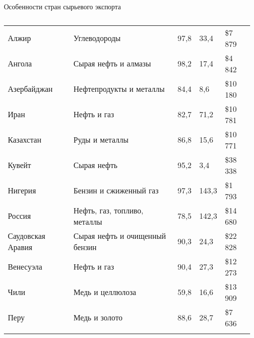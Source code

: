 \documentclass[_Venture_p2.tex]{subfiles}
\begin{document}
\begin{frame}{Особенности стран сырьевого экспорта}
\begin{table}[htbp]
	\centering
	\tiny
	\caption{}
	\begin{tabularx}{\linewidth}
	[b]{@{}>{\raggedright\arraybackslash}RXRRR@{}}
	\setrulecolor\toprule
		 &  &  &  &  \\
		\midrule
		Алжир & Углеводороды & 97,8  & 33,4  & \$7 879 \\
		Ангола & Сырая нефть и алмазы & 98,2  & 17,4  & \$4 842 \\
		Азербайджан & Нефтепродукты и металлы & 84,4  & 8,6   & \$10 180 \\
		Иран  & Нефть и газ & 82,7  & 71,2  & \$10 781 \\
		Казахстан & Руды и металлы & 86,8  & 15,6  & \$10 771 \\
		Кувейт & Сырая нефть & 95,2  & 3,4   & \$38 338 \\
		Нигерия & Бензин и сжиженный газ & 97,3  & 143,3 & \$1 793 \\
		Россия & Нефть, газ, топливо, металлы & 78,5  & 142,3 & \$14 680 \\
		Саудовская Аравия & Сырая нефть и очищенный бензин & 90,3  & 24,3  & \$22 828 \\
		Венесуэла & Нефть и газ & 90,4  & 27,3  & \$12 273 \\
		Чили  & Медь и целлюлоза & 59,8  & 16,6  & \$13 909 \\
		Перу  & Медь и золото & 88,6  & 28,7  & \$7 636 \\
		\bottomrule
	\end{tabularx}%
	\label{tab:addlabel}%
\end{table}%
\end{frame}
\end{document}
